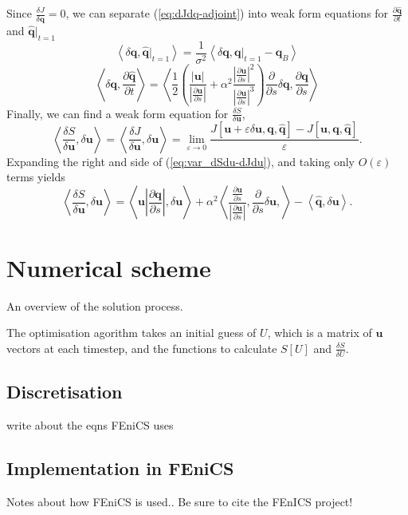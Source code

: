\documentclass[a4paper, 10pt]{article}
\newcommand{\eq}[1]{(\ref{eq:#1})}
\newcommand{\vect}[1]{\ensuremath{\mathbf{#1}}}
\newcommand{\hvect}[1]{\ensuremath{\hat{\vect{#1}}}}
\newcommand{\pp}[2]{\frac{\partial #1}{\partial #2}}
\newcommand{\vv}[2]{\frac{\delta #1}{\delta #2}}
\newcommand{\angles}[1]{\left\langle #1 \right\rangle}
\newcommand{\eps}{\varepsilon}
\begin{document}
Since $\vv{J}{\vect q} = 0$, we can separate \eq{dJdq-adjoint} into weak form equations for $\pp{\hvect q}{t}$ and $\hvect q \big|_{t=1}$
  \begin{equation}
    \label{eq:qh_t1}
    \angles{\delta \vect q, \hvect q\big|_{t=1}} = \frac{1}{\sigma^2}\angles{\delta \vect q, \vect q \big|_{t=1} - \vect q_B}
  \end{equation}
  \begin{equation}
    \label{eq:dqhdt}
    \angles{\delta \vect q, \pp{\hvect q}{t}} = \angles{\frac{1}{2}\left(\frac{\left|\vect u\right|}{\left|\pp{\vect u}{s}\right|} + \alpha^2\frac{\left|\pp{\vect u}{s}\right|^2}{\left|\pp{\vect u}{s}\right|^3}\right)\pp{}{s}\delta \vect q, \pp{\vect q}{s}}
  \end{equation}
Finally, we can find a weak form equation for $\vv{S}{\vect u}$,
\begin{equation}
  \label{eq:var_dSdu-dJdu}
  \angles{\vv{S}{\vect u}, \delta \vect u} = \angles{\vv{J}{\vect u}, \delta \vect u} =
  \lim_{\eps \rightarrow 0} \frac{J[\vect u + \eps \delta \vect u, \vect q, \hvect q] - J[\vect u, \vect q, \hvect q]}{\eps}.
\end{equation}
Expanding the right and side of \eq{var_dSdu-dJdu}, and taking only $O(\eps)$ terms yields
\begin{equation}
  \label{eq:dSdu-deltau}
  \angles{\vv{S}{\vect u}, \delta \vect u} = \angles{\vect u \left|\pp{\vect q}{s}\right|,\delta \vect u} 
  + \alpha^2 \angles{\frac{\pp{\vect u}{s}}{\left|\pp{\vect u}{s}\right|},\pp{}{s}\delta \vect u,}
    - \angles{\hvect q,\delta \vect u}.
\end{equation}


\section{Numerical scheme}

An overview of the solution process.

The optimisation agorithm takes an initial guess of $U$, which is a matrix of $\vect u$ vectors at each timestep, and the functions to calculate $S[U]$ and $\vv{S}{U}$. 
\subsection{Discretisation}

write about the eqns FEniCS uses

\subsection{Implementation in FEniCS}
Notes about how FEniCS is used.. Be sure to cite the FEnICS project!
\end{document}
